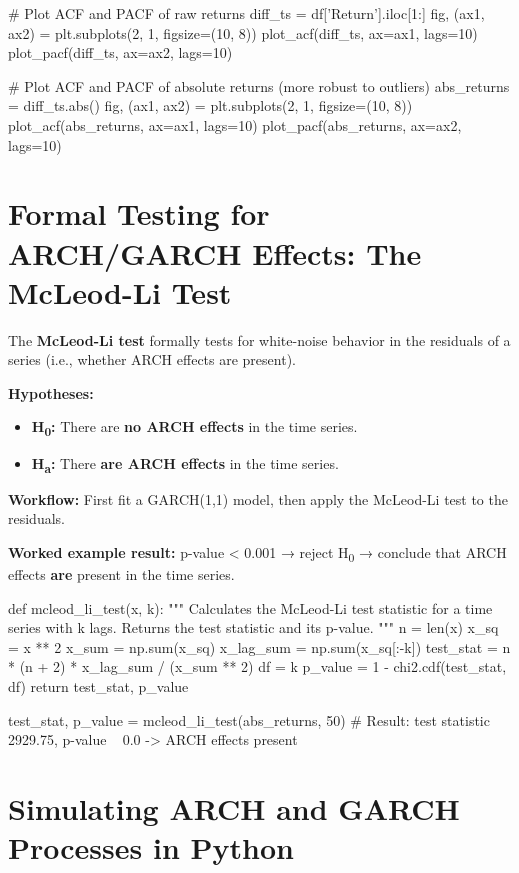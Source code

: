 \documentclass[12pt,openany]{book}
\theoremstyle{definition}
\theoremstyle{remark}
\begin{document}
\begin{python}
# Plot ACF and PACF of raw returns
diff_ts = df['Return'].iloc[1:]
fig, (ax1, ax2) = plt.subplots(2, 1, figsize=(10, 8))
plot_acf(diff_ts, ax=ax1, lags=10)
plot_pacf(diff_ts, ax=ax2, lags=10)

# Plot ACF and PACF of absolute returns (more robust to outliers)
abs_returns = diff_ts.abs()
fig, (ax1, ax2) = plt.subplots(2, 1, figsize=(10, 8))
plot_acf(abs_returns, ax=ax1, lags=10)
plot_pacf(abs_returns, ax=ax2, lags=10)
\end{python}


\section{Formal Testing for ARCH/GARCH Effects: The McLeod-Li Test}

The \textbf{McLeod-Li test} formally tests for white-noise behavior in the residuals of a series (i.e., whether ARCH effects are present).

\textbf{Hypotheses:}
\begin{itemize}
\item \textbf{H\textsubscript{0}:} There are \textbf{no ARCH effects} in the time series.
\item \textbf{H\textsubscript{a}:} There \textbf{are ARCH effects} in the time series.
\end{itemize}

\textbf{Workflow:} First fit a GARCH(1,1) model, then apply the McLeod-Li test to the residuals.

\textbf{Worked example result:} p-value < 0.001 → reject H\textsubscript{0} → conclude that ARCH effects \textbf{are} present in the time series.

\begin{python}
def mcleod_li_test(x, k):
    """
    Calculates the McLeod-Li test statistic for a time series with k lags.
    Returns the test statistic and its p-value.
    """
    n = len(x)
    x_sq = x ** 2
    x_sum = np.sum(x_sq)
    x_lag_sum = np.sum(x_sq[:-k])
    test_stat = n * (n + 2) * x_lag_sum / (x_sum ** 2)
    df = k
    p_value = 1 - chi2.cdf(test_stat, df)
    return test_stat, p_value

test_stat, p_value = mcleod_li_test(abs_returns, 50)
# Result: test statistic ~ 2929.75, p-value ~ 0.0 -> ARCH effects present
\end{python}


\section{Simulating ARCH and GARCH Processes in Python}
\end{document}
